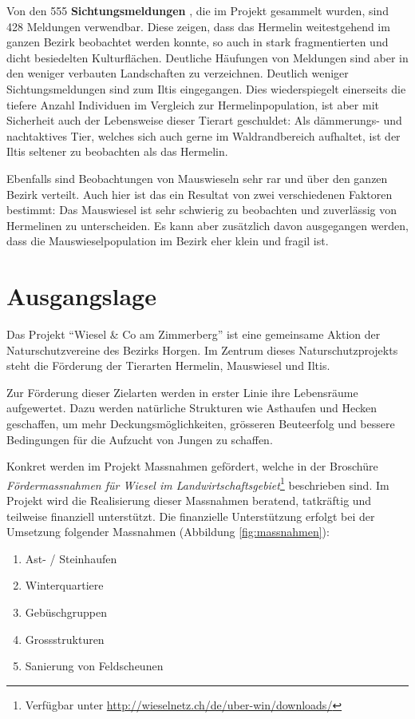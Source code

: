 \documentclass[
  oneside]{scrbook}
\providecommand{\tightlist}{%
  \setlength{\itemsep}{0pt}\setlength{\parskip}{0pt}}
\begin{document}
Von den 555 \textbf{Sichtungsmeldungen} , die im Projekt gesammelt wurden, sind 428 Meldungen verwendbar. Diese zeigen, dass das Hermelin weitestgehend im ganzen Bezirk beobachtet werden konnte, so auch in stark fragmentierten und dicht besiedelten Kulturflächen. Deutliche Häufungen von Meldungen sind aber in den weniger verbauten Landschaften zu verzeichnen. Deutlich weniger Sichtungsmeldungen sind zum Iltis eingegangen. Dies wiederspiegelt einerseits die tiefere Anzahl Individuen im Vergleich zur Hermelinpopulation, ist aber mit Sicherheit auch der Lebensweise dieser Tierart geschuldet: Als dämmerungs- und nachtaktives Tier, welches sich auch gerne im Waldrandbereich aufhaltet, ist der Iltis seltener zu beobachten als das Hermelin.

Ebenfalls sind Beobachtungen von Mauswieseln sehr rar und über den ganzen Bezirk verteilt. Auch hier ist das ein Resultat von zwei verschiedenen Faktoren bestimmt: Das Mauswiesel ist sehr schwierig zu beobachten und zuverlässig von Hermelinen zu unterscheiden. Es kann aber zusätzlich davon ausgegangen werden, dass die Mauswieselpopulation im Bezirk eher klein und fragil ist.

\hypertarget{ausgangslage}{%
\chapter{Ausgangslage}\label{ausgangslage}}

Das Projekt ``Wiesel \& Co am Zimmerberg'' ist eine gemeinsame Aktion der Naturschutzvereine des Bezirks Horgen. Im Zentrum dieses Naturschutzprojekts steht die Förderung der Tierarten Hermelin, Mauswiesel und Iltis.

Zur Förderung dieser Zielarten werden in erster Linie ihre Lebensräume aufgewertet. Dazu werden natürliche Strukturen wie Asthaufen und Hecken geschaffen, um mehr Deckungsmöglichkeiten, grösseren Beuteerfolg und bessere Bedingungen für die Aufzucht von Jungen zu schaffen.

Konkret werden im Projekt Massnahmen gefördert, welche in der Broschüre \emph{Fördermassnahmen für Wiesel im Landwirtschaftsgebiet}\footnote{Verfügbar unter \url{http://wieselnetz.ch/de/uber-win/downloads/}} beschrieben sind. Im Projekt wird die Realisierung dieser Massnahmen beratend, tatkräftig und teilweise finanziell unterstützt. Die finanzielle Unterstützung erfolgt bei der Umsetzung folgender Massnahmen (Abbildung \ref{fig:massnahmen}):

\begin{enumerate}
\def\labelenumi{\arabic{enumi}.}
\tightlist
\item
  Ast- / Steinhaufen
\item
  Winterquartiere
\item
  Gebüschgruppen
\item
  Grossstrukturen
\item
  Sanierung von Feldscheunen
\end{enumerate}
\end{document}

